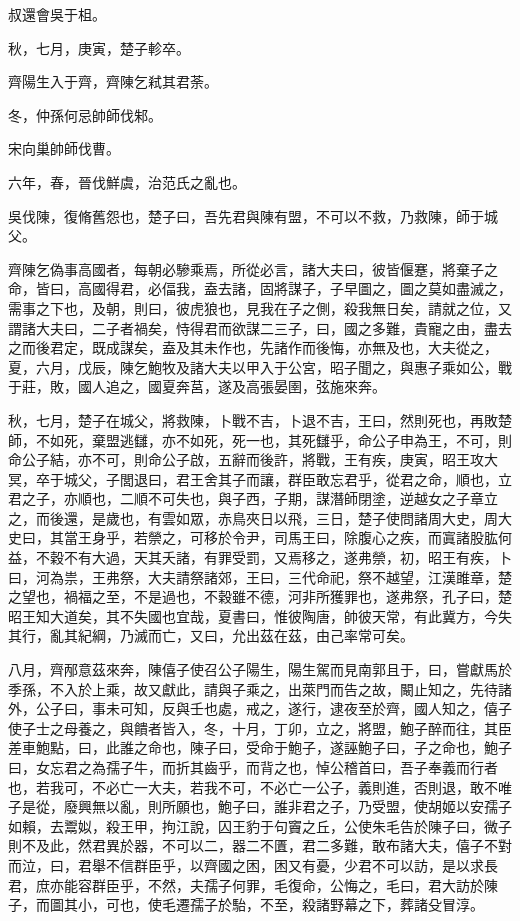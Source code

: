 \begin{pinyinscope}
叔還會吳于柤。

秋，七月，庚寅，楚子軫卒。

齊陽生入于齊，齊陳乞弒其君荼。

冬，仲孫何忌帥師伐邾。

宋向巢帥師伐曹。

六年，春，晉伐鮮虞，治范氏之亂也。

吳伐陳，復脩舊怨也，楚子曰，吾先君與陳有盟，不可以不救，乃救陳，師于城父。

齊陳乞偽事高國者，每朝必驂乘焉，所從必言，諸大夫曰，彼皆偃蹇，將棄子之命，皆曰，高國得君，必偪我，盍去諸，固將謀子，子早圖之，圖之莫如盡滅之，需事之下也，及朝，則曰，彼虎狼也，見我在子之側，殺我無日矣，請就之位，又謂諸大夫曰，二子者禍矣，恃得君而欲謀二三子，曰，國之多難，貴寵之由，盡去之而後君定，既成謀矣，盍及其未作也，先諸作而後悔，亦無及也，大夫從之，夏，六月，戊辰，陳乞鮑牧及諸大夫以甲入于公宮，昭子聞之，與惠子乘如公，戰于莊，敗，國人追之，國夏奔莒，遂及高張晏圉，弦施來奔。

秋，七月，楚子在城父，將救陳，卜戰不吉，卜退不吉，王曰，然則死也，再敗楚師，不如死，棄盟逃讎，亦不如死，死一也，其死讎乎，命公子申為王，不可，則命公子結，亦不可，則命公子啟，五辭而後許，將戰，王有疾，庚寅，昭王攻大冥，卒于城父，子閭退曰，君王舍其子而讓，群臣敢忘君乎，從君之命，順也，立君之子，亦順也，二順不可失也，與子西，子期，謀潛師閉塗，逆越女之子章立之，而後還，是歲也，有雲如眾，赤鳥夾日以飛，三日，楚子使問諸周大史，周大史曰，其當王身乎，若禜之，可移於令尹，司馬王曰，除腹心之疾，而寘諸股肱何益，不穀不有大過，天其夭諸，有罪受罰，又焉移之，遂弗禜，初，昭王有疾，卜曰，河為祟，王弗祭，大夫請祭諸郊，王曰，三代命祀，祭不越望，江漢雎章，楚之望也，禍福之至，不是過也，不穀雖不德，河非所獲罪也，遂弗祭，孔子曰，楚昭王知大道矣，其不失國也宜哉，夏書曰，惟彼陶唐，帥彼天常，有此冀方，今失其行，亂其紀綱，乃滅而亡，又曰，允出茲在茲，由己率常可矣。

八月，齊邴意茲來奔，陳僖子使召公子陽生，陽生駕而見南郭且于，曰，嘗獻馬於季孫，不入於上乘，故又獻此，請與子乘之，出萊門而告之故，闞止知之，先待諸外，公子曰，事未可知，反與壬也處，戒之，遂行，逮夜至於齊，國人知之，僖子使子士之母養之，與饋者皆入，冬，十月，丁卯，立之，將盟，鮑子醉而往，其臣差車鮑點，曰，此誰之命也，陳子曰，受命于鮑子，遂誣鮑子曰，子之命也，鮑子曰，女忘君之為孺子牛，而折其齒乎，而背之也，悼公稽首曰，吾子奉義而行者也，若我可，不必亡一大夫，若我不可，不必亡一公子，義則進，否則退，敢不唯子是從，廢興無以亂，則所願也，鮑子曰，誰非君之子，乃受盟，使胡姬以安孺子如賴，去鬻姒，殺王甲，拘江說，囚王豹于句竇之丘，公使朱毛告於陳子曰，微子則不及此，然君異於器，不可以二，器二不匱，君二多難，敢布諸大夫，僖子不對而泣，曰，君舉不信群臣乎，以齊國之困，困又有憂，少君不可以訪，是以求長君，庶亦能容群臣乎，不然，夫孺子何罪，毛復命，公悔之，毛曰，君大訪於陳子，而圖其小，可也，使毛遷孺子於駘，不至，殺諸野幕之下，葬諸殳冒淳。


\end{pinyinscope}
